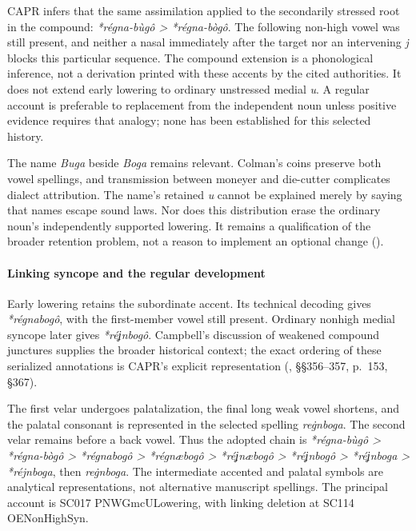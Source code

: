 \documentclass[
  british,
  a4paper,
]{article}
\newcounter{none} %
\begin{document}
CAPR infers that the same assimilation applied to the secondarily
stressed root in the compound: \emph{*régna-bùgô > *régna-bògô}. The
following non-high vowel was still present, and neither a nasal
immediately after the target nor an intervening \emph{j} blocks this
particular sequence. The compound extension is a phonological inference,
not a derivation printed with these accents by the cited authorities. It
does not extend early lowering to ordinary unstressed medial \emph{u}. A
regular account is preferable to replacement from the independent noun
unless positive evidence requires that analogy; none has been
established for this selected history.

The name {\emph{Buga}} beside {\emph{Boga}} remains relevant. Colman's
coins preserve both vowel spellings, and transmission between moneyer
and die-cutter complicates dialect attribution. The name's retained
\emph{u} cannot be explained merely by saying that names escape sound
laws. Nor does this distribution erase the ordinary noun's independently
supported lowering. It remains a qualification of the broader retention
problem, not a reason to implement an optional change
().

\paragraph{Linking syncope and the regular
development}\label{linking-syncope-and-the-regular-development}

Early lowering retains the subordinate accent. Its technical decoding
gives \emph{*régnabogô}, with the first-member vowel still present.
Ordinary nonhigh medial syncope later gives \emph{*réʝnbogô}. Campbell's
discussion of weakened compound junctures supplies the broader
historical context; the exact ordering of these serialized annotations
is CAPR's explicit representation (, §§356--357, p.~153, §367).

The first velar undergoes palatalization, the final long weak vowel
shortens, and the palatal consonant is represented in the selected
spelling {\emph{reġnboga}}. The second velar remains before a back
vowel. Thus the adopted chain is
\emph{*régna-bùgô > *régna-bògô > *régnabogô > *régnæbogô > *réʝnæbogô
> *réʝnbogô > *réʝnboga > *réjnboga}, then \emph{reġnboga}. The
intermediate accented and palatal symbols are analytical
representations, not alternative manuscript spellings. The principal
account is SC017 PNWGmcULowering, with linking deletion at SC114
OENonHighSyn.
\end{document}
